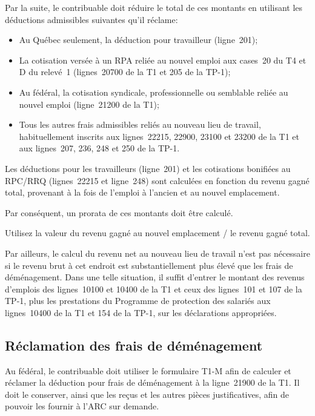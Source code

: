 Par la suite, le contribuable doit réduire le total de ces montants en utilisant les déductions admissibles suivantes qu'il réclame:
\begin{itemize}
	\item Au Québec seulement, la déduction pour travailleur (ligne~201);
	\item La cotisation versée à un RPA reliée au nouvel emploi aux cases~20 du T4 et D du relevé~1 (lignes~20700 de la T1 et 205 de la TP-1);
	\item Au fédéral, la cotisation syndicale, professionnelle ou semblable reliée au nouvel emploi (ligne~21200 de la T1);
	\item Tous les autres frais admissibles reliés au nouveau lieu de travail, habituellement inscrits aux lignes~22215, 22900, 23100 et 23200 de la T1 et aux lignes~207, 236, 248 et 250 de la TP-1.
\end{itemize}

\begin{note}
	Les déductions pour les travailleurs (ligne~201) et les cotisations bonifiées au RPC/RRQ (lignes~22215 et ligne~248) sont calculées en fonction du revenu gagné total, provenant à la fois de l'emploi à l'ancien et au nouvel emplacement. 
	
	Par conséquent, un prorata de ces montants doit être calculé. 
	
	Utilisez la valeur du revenu gagné au nouvel emplacement / le revenu gagné total.
\end{note}

Par ailleurs, le calcul du revenu net au nouveau lieu de travail n'est pas nécessaire si le revenu brut à cet endroit est substantiellement plus élevé que les frais de déménagement. Dans une telle situation, il suffit d'entrer le  montant des revenus d'emplois des lignes~10100 et 10400 de la T1 et ceux des lignes~101 et 107 de la TP-1, plus les prestations du Programme de protection des salariés aux lignes~10400 de la T1 et 154 de la TP-1, sur les déclarations appropriées.


\subsection{Réclamation des frais de déménagement}
Au fédéral, le contribuable doit utiliser le formulaire T1-M afin de calculer et réclamer la déduction pour frais de déménagement à la ligne~21900 de la T1. Il doit le conserver, ainsi que les reçus et les autres pièces justificatives, afin de pouvoir les fournir à l'ARC sur demande.

